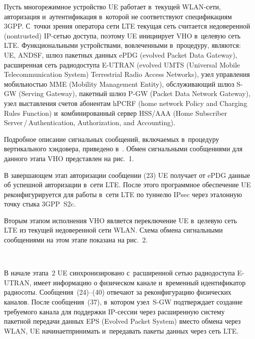 \begin{multicols}{2}
  Пусть многорежимное устройство UE работает в~текущей WLAN-сети, 
авторизация и~аутентификация в~которой не соответствуют спецификациям 
3GPP. С~точки зрения оператора сети LTE текущая сеть считается 
недоверенной (nontrusted) IP-сетью доступа, поэтому UE инициирует VHO 
в~целевую сеть LTE. Функциональными устройствами, вовлеченными 
в~процедуру, являются: UE, ANDSF, шлюз пакетных данных ePDG (evolved 
Packet Data Gateway), расширенная сеть радиодоступа E-UTRAN (evolved 
UMTS (Universal Mobile Telecommunication
System) Terrestrial Radio Access Networks), узел управления мобильностью MME 
(Mobility Management Entity), обслуживающий шлюз S-GW (Serving Gateway), 
пакетный шлюз P-GW (Packet Data Network Gateway), узел выставления счетов 
абонентам hPCRF (home network Policy and Charging Rules Function) 
и~комбинированный сервер HSS/AAA (Home Subscriber 
Server\,/\,Authentication, Authorization, and Accounting). 

Подробное описание 
сигнальных сообщений, включаемых в~процедуру вертикального хэндовера, 
приведено в~\cite{14-gre}.
%
Обмен сигнальными сообщениями для данного этапа 
VHO представлен на рис.~1. 
{

}
  
  В завершающем этап авторизации сообщении (23) UE получает от ePDG 
данные об успешной ав\-то\-ризации в~сети LTE. После этого программное\linebreak 
обеспечение UE реконфигурируется для работы в~сети LTE по туннелю IPsec 
через эталонную точку стыка 3GPP~S2c. 
  



  Вторым этапом исполнения VHO является переключение UE в~целевую сеть 
LTE из текущей недоверенной сети WLAN. Схема обмена сигнальными 
сообщениями на этом этапе показана на рис.~2. 

\begin{figure*}[b] %
\vspace*{1pt}
 \begin{center}
 \mbox{%
 \epsfxsize=151.044mm 
 }
 \end{center}
\vspace*{-9pt}
\end{figure*}
  
  В начале этапа~2 UE синхронизировано с~расширенной сетью радиодоступа 
E-UTRAN, имеет информацию о физическом канале и~временный 
идентификатор радиосоты. Сообщения~(24)--(40)\linebreak
 отвечают за реконфигурацию 
физических каналов. После сообщения~(37), в~котором узел~\mbox{S-GW} 
подтверждает создание требуемого канала для поддержки IP-сес\-сии через 
расширенную систему пакетной передачи данных EPS (Evolved Packet System) 
вместо обмена через WLAN, UE начинает\linebreak принимать и~передавать пакеты 
данных через сеть LTE. 
  



\end{multicols}
